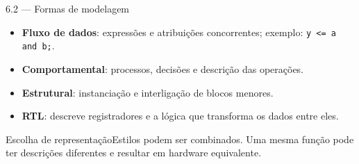 \begin{frame}[t]{6.2 — Formas de modelagem}
\begin{itemize}
\item \textbf{Fluxo de dados}: expressões e atribuições concorrentes; exemplo: \texttt{y <= a and b;}.
\item \textbf{Comportamental}: processos, decisões e descrição das operações.
\item \textbf{Estrutural}: instanciação e interligação de blocos menores.
\item \textbf{RTL}: descreve registradores e a lógica que transforma os dados entre eles.
\end{itemize}\begin{block}{Escolha de representação}Estilos podem ser combinados. Uma mesma função pode ter descrições diferentes e resultar em hardware equivalente.\end{block}
\end{frame}
